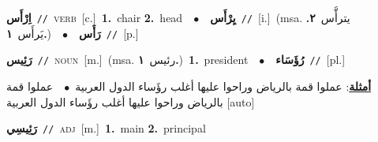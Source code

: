 \documentclass[10pt,a4paper,twoside]{article} %
\begin{document}
\begin{multicols}{2}
{\setlength\topsep{0pt}\textbf{\foreignlanguage{arabic}{اِرْأَس}}\ {\color{gray}\texttt{//}\color{black}}\ \textsc{verb}\ [c.]\ \textbf{1.}~chair  \textbf{2.}~head\ \ $\bullet$\ \ \setlength\topsep{0pt}\textbf{\foreignlanguage{arabic}{يِرْأَس}}\ {\color{gray}\texttt{//}\color{black}}\ [i.]\ \color{gray}(msa. \foreignlanguage{arabic}{يترأَّس}~\foreignlanguage{arabic}{\textbf{٢.}}  \foreignlanguage{arabic}{يَرأَس}~\foreignlanguage{arabic}{\textbf{١.}})\color{black}\ \ $\bullet$\ \ \setlength\topsep{0pt}\textbf{\foreignlanguage{arabic}{رَأَس}}\ {\color{gray}\texttt{//}\color{black}}\ [p.]\ 

{\setlength\topsep{0pt}\textbf{\foreignlanguage{arabic}{رَئِيس}}\ {\color{gray}\texttt{//}\color{black}}\ \textsc{noun}\ [m.]\ \color{gray}(msa. \foreignlanguage{arabic}{رئيس}~\foreignlanguage{arabic}{\textbf{١.}})\color{black}\ \textbf{1.}~president\ \ $\bullet$\ \ \setlength\topsep{0pt}\textbf{\foreignlanguage{arabic}{رُؤَسَاء}}\ {\color{gray}\texttt{//}\color{black}}\ [pl.]\  \begin{flushright}\color{gray}\foreignlanguage{arabic}{\textbf{\underline{\foreignlanguage{arabic}{أمثلة}}}: عملوا قمة بالرياض وراحوا عليها أغلب رؤَساء الدول العربية\ $\bullet$\ \  عملوا قمة بالرياض وراحوا عليها أغلب رؤَساء الدول العربية [auto]}\end{flushright}\color{black}} \vspace{2mm}

{\setlength\topsep{0pt}\textbf{\foreignlanguage{arabic}{رَئِيسِي}}\ {\color{gray}\texttt{//}\color{black}}\ \textsc{adj}\ [m.]\ \textbf{1.}~main  \textbf{2.}~principal\ 

}}
\end{multicols}
\end{document}
